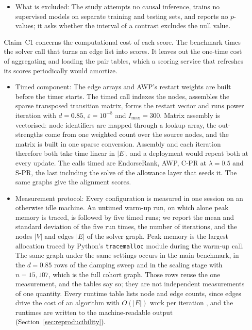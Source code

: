 \begin{itemize}
\item What is excluded: The study attempts no causal inference, trains no supervised models on separate training and testing sets, and reports no $p$-values; it asks whether the interval of a contrast excludes the null value.

\end{itemize}


Claim~C1 concerns the computational cost of each score. The benchmark times the solver call that turns an edge list into scores. It leaves out the one-time cost of aggregating and loading the pair tables, which a scoring service that refreshes its scores periodically would amortize.

\begin{itemize}
\item Timed component: The edge arrays and AWP's restart weights are built before the timer starts. The timed call indexes the nodes, assembles the sparse transposed transition matrix, forms the restart vector and runs power iteration with $d=0.85$, $\varepsilon=10^{-8}$ and $I_{\max}=300$. Matrix assembly is vectorised: node identifiers are mapped through a lookup array, the out-strengths come from one weighted count over the source nodes, and the matrix is built in one sparse conversion. Assembly and each iteration therefore both take time linear in $|E|$, and a deployment would repeat both at every update. The calls timed are EndorseRank, AWP, C-PR at $\lambda=0.5$ and S-PR, the last including the solve of the allowance layer that seeds it. The same graphs give the alignment scores.

\item Measurement protocol: Every configuration is measured in one session on an otherwise idle machine. An untimed warm-up run, on which alone peak memory is traced, is followed by five timed runs; we report the mean and standard deviation of the five run times, the number of iterations, and the nodes $|V|$ and edges $|E|$ of the solver graph. Peak memory is the largest allocation traced by Python's \texttt{tracemalloc} module during the warm-up call. The same graph under the same settings occurs in the main benchmark, in the $d=0.85$ rows of the damping sweep and in the scaling stage with $n=15{,}107$, which is the full cohort graph. Those rows reuse the one measurement, and the tables say so; they are not independent measurements of one quantity. Every runtime table lists node and edge counts, since edges drive the cost of an algorithm with $O(|E|)$ work per iteration \parencite{leskovec2020mining}, and the runtimes are written to the machine-readable output (Section~\ref{sec:reproducibility}).


\end{itemize}
